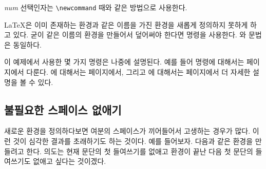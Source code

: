 \emph{num} 선택인자는 \verb|\newcommand| 때와 같은 방법으로 사용한다.

\LaTeX 은 이미 존재하는 환경과 같은 이름을 가진 환경을 새롭게 정의하지 못하게 하고 있다. 굳이 같은 이름의 환경을 만들어서 덮어써야 한다면  명령을 사용한다. 와 문법은 동일하다.

이 예제에서 사용한 몇 가지 명령은 나중에 설명된다. 예를 들어  명령에 대해서는 \pageref{sec:rule}페이지에서 다룬다. 에 대해서는 \pageref{cmd:stretch}페이지에서, 그리고 에 대해서는 \pageref{sec:hspace}페이지에서 더 자세한 설명을 볼 수 있다.

\subsection{불필요한 스페이스 없애기}

새로운 환경을 정의하다보면 여분의 스페이스가 끼어들어서 고생하는 경우가 많다. 
이런 것이 심각한 결과를 초래하기도 하는 것이다.
예를 들어보자. 다음과 같은 환경을 만들려고 한다. 의도는 현재 문단의 첫 들여쓰기를 없애고 환경이 끝난 다음 첫 문단의 들여쓰기도 없애고 싶다는 것이겠다.


